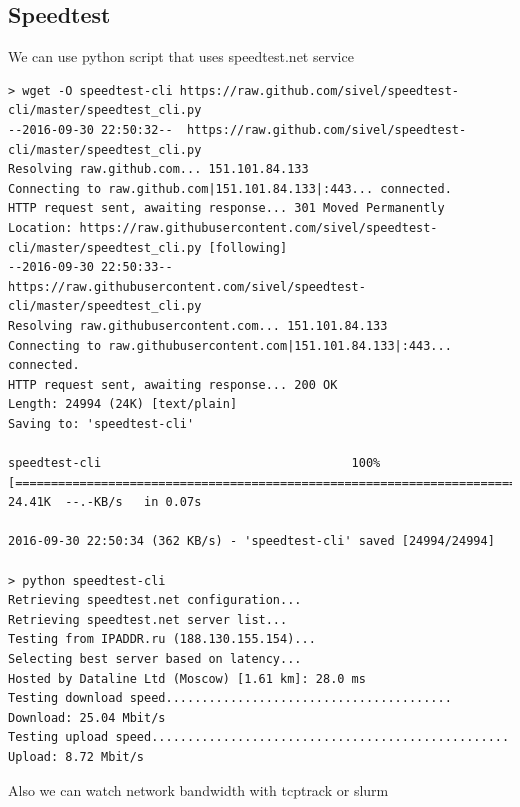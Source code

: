 \documentclass[10pt]{article}
\begin{document}
\subsection{Speedtest}
We can use python script that uses speedtest.net service
\begin{verbatim}
> wget -O speedtest-cli https://raw.github.com/sivel/speedtest-cli/master/speedtest_cli.py
--2016-09-30 22:50:32--  https://raw.github.com/sivel/speedtest-cli/master/speedtest_cli.py
Resolving raw.github.com... 151.101.84.133
Connecting to raw.github.com|151.101.84.133|:443... connected.
HTTP request sent, awaiting response... 301 Moved Permanently
Location: https://raw.githubusercontent.com/sivel/speedtest-cli/master/speedtest_cli.py [following]
--2016-09-30 22:50:33--  https://raw.githubusercontent.com/sivel/speedtest-cli/master/speedtest_cli.py
Resolving raw.githubusercontent.com... 151.101.84.133
Connecting to raw.githubusercontent.com|151.101.84.133|:443... connected.
HTTP request sent, awaiting response... 200 OK
Length: 24994 (24K) [text/plain]
Saving to: 'speedtest-cli'

speedtest-cli                                   100%[========================================================================================================>]  24.41K  --.-KB/s   in 0.07s

2016-09-30 22:50:34 (362 KB/s) - 'speedtest-cli' saved [24994/24994]

> python speedtest-cli
Retrieving speedtest.net configuration...
Retrieving speedtest.net server list...
Testing from IPADDR.ru (188.130.155.154)...
Selecting best server based on latency...
Hosted by Dataline Ltd (Moscow) [1.61 km]: 28.0 ms
Testing download speed........................................
Download: 25.04 Mbit/s
Testing upload speed..................................................
Upload: 8.72 Mbit/s
\end{verbatim}

Also we can watch network bandwidth with tcptrack or slurm \\ \\
\end{document}
